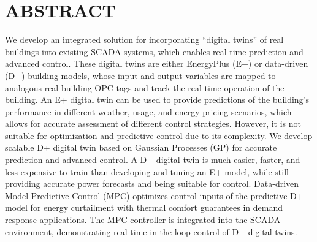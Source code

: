 \section{ABSTRACT}

We develop an integrated solution for incorporating ``digital twins” of real buildings into existing SCADA systems, which enables real-time prediction and advanced control. 
These digital twins are either EnergyPlus (E+) or data-driven (D+) building models, whose input and output variables are mapped to analogous real building OPC tags and track the real-time operation of the building.
An E+ digital twin can be used to provide predictions of the building’s performance in different weather, usage, and energy pricing scenarios, which allows for accurate assessment of different control strategies. 
However, it is not suitable for optimization and predictive control due to its complexity. 
We develop scalable D+ digital twin based on Gaussian Processes (GP) for accurate prediction and advanced control. 
A D+ digital twin is much easier, faster, and less expensive to train than developing and tuning an E+ model, while still providing accurate power forecasts and being suitable for control. 
Data-driven Model Predictive Control (MPC) optimizes control inputs of the predictive D+ model for energy curtailment with thermal comfort guarantees in demand response applications.
The MPC controller is integrated into the SCADA environment, demonstrating real-time in-the-loop control of D+ digital twins.

